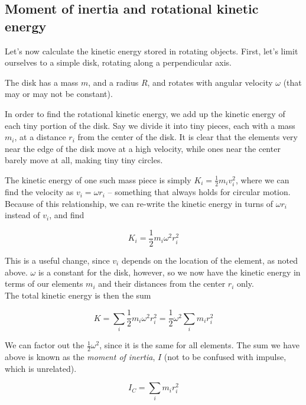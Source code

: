 \documentclass[12pt,a4paper]{report}
\begin{document}
\subsection{Moment of inertia and rotational kinetic energy}

Let's now calculate the kinetic energy stored in rotating objects. First, let's limit ourselves to a simple disk, rotating along a perpendicular axis.

The disk has a mass $m$, and a radius $R$, and rotates with angular velocity $\omega$ (that may or may not be constant).

In order to find the rotational kinetic energy, we add up the kinetic energy of each tiny portion of the disk. Say we divide it into tiny pieces, each with a mass $m_i$, at a distance $r_i$ from the center of the disk.  It is clear that the elements very near the edge of the disk move at a high velocity, while ones near the center barely move at all, making tiny tiny circles.

The kinetic energy of one such mass piece is simply $\displaystyle K_i = \frac{1}{2} m_i v_i^2$, where we can find the velocity as $v_i = \omega r_i$ -- something that always holds for circular motion. Because of this relationship, we can re-write the kinetic energy in turns of $\omega r_i$ instead of $v_i$, and find

\begin{equation}
K_i = \frac{1}{2} m_i \omega^2 r_i^2
\end{equation}

This is a useful change, since $v_i$ depends on the location of the element, as noted above. $\omega$ is a constant for the disk, however, so we now have the kinetic energy in terms of our elements $m_i$ and their distances from the center $r_i$ only.\\
The total kinetic energy is then the sum

\begin{equation}
K = \sum_i \frac{1}{2} m_i \omega^2 r_i^2 = \frac{1}{2} \omega^2 \sum_i m_i r_i^2
\end{equation}

We can factor out the $\displaystyle \frac{1}{2} \omega^2$, since it is the same for all elements. The sum we have above is known as the \emph{moment of inertia}, $I$ (not to be confused with impulse, which is unrelated).

\begin{equation}
I_C = \sum_i m_i r_i^2
\end{equation}
\end{document}

